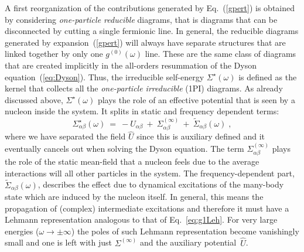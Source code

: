 A first reorganization of the contributions generated by Eq.~(\ref{gpert}) is obtained by considering 
\emph{one-particle reducible} diagrams, that is diagrams that can be disconnected by cutting a single fermionic line. 
In general, the reducible diagrams  generated by expansion~(\ref{gpert}) will always have separate structures that are linked together by only one $g^{(0)}(\omega)$ line. These are the same class of diagrams that are created implicitly in the all-orders resummation of the Dyson equation~(\ref{eq:Dyson}). 
 Thus, the irreducible self-energy $\Sigma^\star(\omega)$ is defined as the kernel that collects all the \emph{one-particle irreducible} (1PI) diagrams.
%
As already discussed above,  $\Sigma^\star(\omega)$ plays the role of an effective  potential that  is seen by a nucleon inside the system. It splits in static  and frequency dependent terms:
\begin{equation}
  \Sigma^\star_{\alpha \beta}(\omega) ~=~   - U_{\alpha \beta}  ~+~  \Sigma^{(\infty)}_{\alpha \beta}
      ~+~  \widetilde\Sigma_{\alpha \beta}(\omega)  \; ,
\label{eq:SigSplit}
\end{equation}
where we have separated the field $\widehat{U}$ since this is auxiliary defined and it eventually cancels out when solving the Dyson equation. The term $\Sigma^{(\infty)}_{\alpha \beta}$ plays the role of the static mean-field that a nucleon feels due to the average  interactions will all
other particles in the system.
The frequency-dependent part, $ \widetilde\Sigma_{\alpha \beta}(\omega)$, describes the effect due to dynamical excitations of the many-body state which are induced by the nucleon itself. In general, this means the  propagation of (complex) intermediate excitations and therefore it must have  
a Lehmann representation analogous to that of Eq.~\eqref{eq:g1Leh}.
For very large energies ($\omega \rightarrow \pm\infty$) the poles of such Lehmann representation become vanishingly  small and one is left with just $\Sigma^{(\infty)}$ and the auxiliary potential~$\widehat{U}$.


